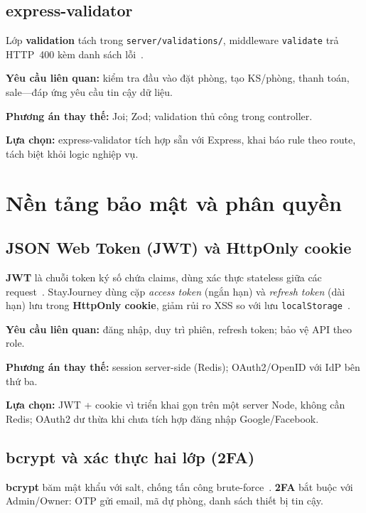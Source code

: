 \documentclass[../DoAn.tex]{subfiles}
\begin{document}
\subsection{express-validator}

Lớp \textbf{validation} tách trong \texttt{server/validations/}, middleware \texttt{validate} trả HTTP~400 kèm danh sách lỗi~\cite{expressvalidator2024}.

\textbf{Yêu cầu liên quan:} kiểm tra đầu vào đặt phòng, tạo KS/phòng, thanh toán, sale---đáp ứng yêu cầu tin cậy dữ liệu.

\textbf{Phương án thay thế:} Joi; Zod; validation thủ công trong controller.

\textbf{Lựa chọn:} express-validator tích hợp sẵn với Express, khai báo rule theo route, tách biệt khỏi logic nghiệp vụ.

\section{Nền tảng bảo mật và phân quyền}
\label{section:3.5}

\subsection{JSON Web Token (JWT) và HttpOnly cookie}

\textbf{JWT} là chuỗi token ký số chứa claims, dùng xác thực stateless giữa các request~\cite{jones2015jwt}. StayJourney dùng cặp \textit{access token} (ngắn hạn) và \textit{refresh token} (dài hạn) lưu trong \textbf{HttpOnly cookie}, giảm rủi ro XSS so với lưu \texttt{localStorage}~\cite{owasp2023session}.

\textbf{Yêu cầu liên quan:} đăng nhập, duy trì phiên, refresh token; bảo vệ API theo role.

\textbf{Phương án thay thế:} session server-side (Redis); OAuth2/OpenID với IdP bên thứ ba.

\textbf{Lựa chọn:} JWT + cookie vì triển khai gọn trên một server Node, không cần Redis; OAuth2 dư thừa khi chưa tích hợp đăng nhập Google/Facebook.

\subsection{bcrypt và xác thực hai lớp (2FA)}

\textbf{bcrypt} băm mật khẩu với salt, chống tấn công brute-force~\cite{provos1999bcrypt}. \textbf{2FA} bắt buộc với Admin/Owner: OTP gửi email, mã dự phòng, danh sách thiết bị tin cậy.
\end{document}
